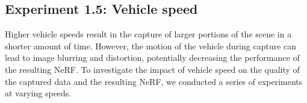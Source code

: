 








\subsection{Experiment 1.5: Vehicle speed} \label{sec:exp-speed}
Higher vehicle speeds result in the capture of larger portions of the scene in a shorter amount of time. However, the motion of the vehicle during capture can lead to image blurring and distortion, potentially decreasing the performance of the resulting NeRF. To investigate the impact of vehicle speed on the quality of the captured data and the resulting NeRF, we conducted a series of experiments at varying speeds.



